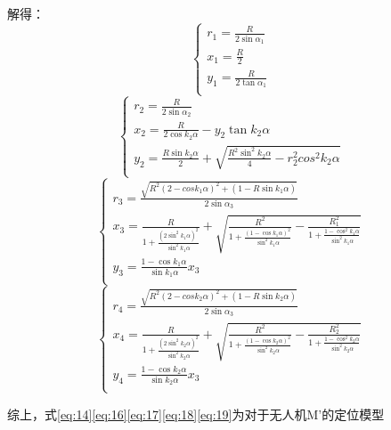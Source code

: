 \documentclass{cumcmthesis}
\begin{document}
解得：
\begin{equation}
	\begin{cases}
		r_1=\frac{R}{2\sin \alpha_1}\\
		x_1=\frac{R}{2}\\
		y_1=\frac{R}{2\tan \alpha_1}\\
	\end{cases}
	\label{eq:16}
\end{equation}
\begin{equation}
	\begin{cases}
		r_2=\frac{R}{2\sin \alpha_2}\\
		x_2=\frac{R}{2\cos k_2 \alpha}-y_2 \tan k_2\alpha \\
		y_2=\frac{R\sin k_2 \alpha}{2} +\sqrt{ \frac{R^2 \sin^2 k_2 \alpha}{4} - r_2^2cos^2 k_2 \alpha}\\
	\end{cases}
	\label{eq:17}
\end{equation}
\begin{equation}
	\begin{cases}
		r_3=\frac{\sqrt{R^2(2-cos k_1 \alpha)^2 + (1-R\sin k_1 \alpha )}}{2\sin \alpha_3}\\
		x_3=\frac{R}{1+\frac{(2\sin^2 k_1 \alpha)^2}{\sin^2 k_1 \alpha}}+ \sqrt{\frac{R^2}{1+\frac{(1-\cos k_1 \alpha)^2}{\sin^2 k_1 \alpha}}-\frac{R_1^2}{1+\frac{1-\cos^2 k_1 \alpha}{\sin^2 k_1 \alpha}}}\\
		y_3=\frac{1-\cos k_1 \alpha}{\sin k_1 \alpha} x_3\\
	\end{cases}
	\label{eq:18}
\end{equation}
\begin{equation}
	\begin{cases}
		r_4=\frac{\sqrt{R^2(2-cos k_2 \alpha)^2 + (1-R\sin k_2 \alpha )}}{2\sin \alpha_3}\\
		x_4=\frac{R}{1+\frac{(2\sin^2 k_2 \alpha)^2}{\sin^2 k_2 \alpha}}+ \sqrt{\frac{R^2}{1+\frac{(1-\cos k_2 \alpha)^2}{\sin^2 k_2 \alpha}}-\frac{R_2^2}{1+\frac{1-\cos^2 k_2 \alpha}{\sin^2 k_2 \alpha}}}\\
		y_4=\frac{1-\cos k_2 \alpha}{\sin k_2 \alpha} x_3\\
	\end{cases}
	\label{eq:19}
\end{equation}

综上，式\cref{eq:14}\cref{eq:16}\cref{eq:17}\cref{eq:18}\cref{eq:19}为对于无人机M'的定位模型
\end{document}
